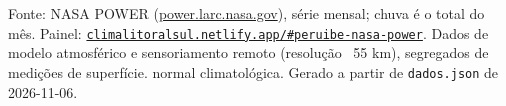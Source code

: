 \documentclass[10pt,a4paper]{article}
\begin{document}
\vspace{1pt}
{\tiny\color{cinza}
Fonte: NASA POWER (\href{https://power.larc.nasa.gov}{power.larc.nasa.gov}), série mensal;
chuva é o total do mês. Painel:
\href{https://climalitoralsul.netlify.app/\#peruibe-nasa-power}%
{\texttt{climalitoralsul.netlify.app/\#peruibe-nasa-power}}.
Dados de modelo atmosférico e sensoriamento remoto (resolução ~55 km), segregados de medições de superfície. 
normal climatológica.
Gerado a partir de \texttt{dados.json} de 2026-11-06.}
\end{document}
